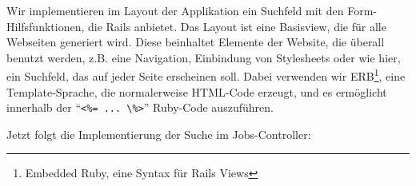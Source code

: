 %                                                                                                                                          

Wir implementieren im Layout der Applikation ein Suchfeld mit den Form-Hilfsfunktionen, die Rails anbietet. Das Layout ist eine Basisview, die für alle Webseiten generiert wird. Diese beinhaltet Elemente der Website, die überall benutzt werden, z.B. eine Navigation, Einbindung von Stylesheets oder wie hier, ein Suchfeld, das auf jeder Seite erscheinen soll. Dabei verwenden wir  ERB\footnote{Embedded Ruby, eine Syntax für Rails Views}, eine Template-Sprache, die normalerweise HTML-Code erzeugt, und es ermöglicht innerhalb der "`\verb|<%= ... \%>|"' Ruby-Code auszuführen.

Jetzt folgt die Implementierung der Suche im Jobs-Controller:

